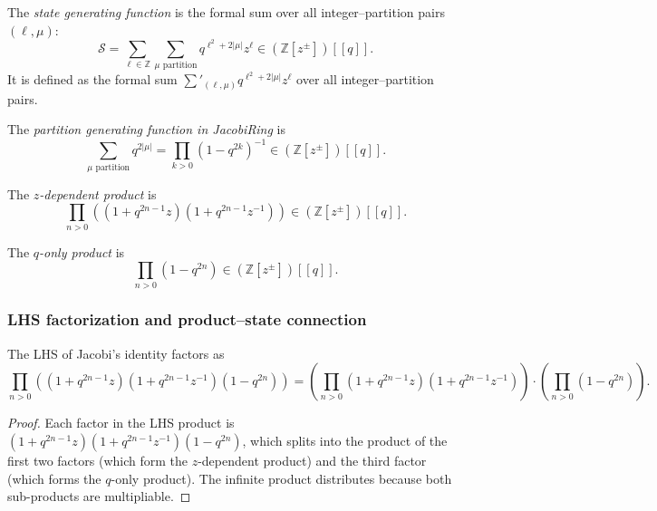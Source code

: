 \begin{definition}
\label{def.jtp.stateGenFun}
\leanhelper
\leanok
The \emph{state generating function} is the formal sum over all
integer--partition pairs $(\ell, \mu)$:
\[
\mathcal{S} = \sum_{\ell\in\mathbb{Z}} \sum_{\mu\text{ partition}}
q^{\ell^2 + 2|\mu|} z^\ell
\in (\mathbb{Z}[z^{\pm}])[[q]].
\]
It is defined as the formal sum
$\sum'_{(\ell, \mu)} q^{\ell^2 + 2|\mu|} z^\ell$
over all integer--partition pairs.
\end{definition}

\begin{definition}
\label{def.jtp.partitionGenFunJacobi}
\leanhelper
\leanok
The \emph{partition generating function in JacobiRing} is
\[
\sum_{\mu\text{ partition}} q^{2|\mu|}
= \prod_{k>0}(1-q^{2k})^{-1}
\in (\mathbb{Z}[z^{\pm}])[[q]].
\]
\end{definition}

\begin{definition}
\label{def.jtp.jacobiZZProduct}
\leanhelper
\leanok
The \emph{$z$-dependent product} is
\[
\prod_{n>0}\left((1+q^{2n-1}z)(1+q^{2n-1}z^{-1})\right)
\in (\mathbb{Z}[z^{\pm}])[[q]].
\]
\end{definition}

\begin{definition}
\label{def.jtp.jacobiQProduct}
\leanhelper
\leanok
The \emph{$q$-only product} is
\[
\prod_{n>0}(1-q^{2n})
\in (\mathbb{Z}[z^{\pm}])[[q]].
\]
\end{definition}

\subsubsection{LHS factorization and product--state connection}

\begin{lemma}
\label{lem.jtp.jacobiLHS-eq-ZZProduct-mul-QProduct}
\leanhelper
\leanok
The LHS of Jacobi's identity factors as
\[
\prod_{n>0}\left((1+q^{2n-1}z)(1+q^{2n-1}z^{-1})(1-q^{2n})\right)
= \left(\prod_{n>0}(1+q^{2n-1}z)(1+q^{2n-1}z^{-1})\right)
\cdot \left(\prod_{n>0}(1-q^{2n})\right).
\]
\end{lemma}

\begin{proof}
\leanok
Each factor in the LHS product is
$(1+q^{2n-1}z)(1+q^{2n-1}z^{-1})(1-q^{2n})$,
which splits into the product of the first two factors (which form the $z$-dependent product)
and the third factor (which forms the $q$-only product). The infinite product
distributes because both sub-products are multipliable.
\end{proof}

